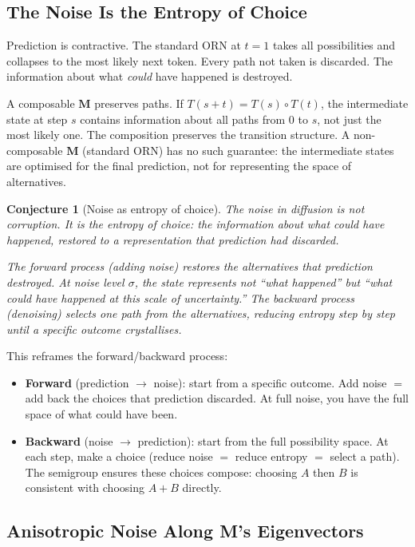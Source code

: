\documentclass[11pt, a4paper]{article}
\newcommand{\M}{\mathbf{M}}
\theoremstyle{plain}
\newtheorem{conjecture}{Conjecture}
\theoremstyle{remark}
\begin{document}
\subsection{The Noise Is the Entropy of Choice}

Prediction is contractive.
The standard ORN at $t{=}1$ takes all possibilities and collapses to the most likely next token.
Every path not taken is discarded.
The information about what \emph{could} have happened is destroyed.

A composable $\M$ preserves paths.
If $T(s{+}t) = T(s) \circ T(t)$, the intermediate state at step $s$ contains information about all paths from 0 to $s$, not just the most likely one.
The composition preserves the transition structure.
A non-composable $\M$ (standard ORN) has no such guarantee: the intermediate states are optimised for the final prediction, not for representing the space of alternatives.

\begin{conjecture}[Noise as entropy of choice]
The noise in diffusion is not corruption.
It is the \emph{entropy of choice}: the information about what could have happened, restored to a representation that prediction had discarded.

The forward process (adding noise) restores the alternatives that prediction destroyed.
At noise level $\sigma$, the state represents not ``what happened'' but ``what could have happened at this scale of uncertainty.''
The backward process (denoising) selects one path from the alternatives, reducing entropy step by step until a specific outcome crystallises.
\end{conjecture}

This reframes the forward/backward process:
\begin{itemize}[nosep]
    \item \textbf{Forward} (prediction $\to$ noise): start from a specific outcome.  Add noise $=$ add back the choices that prediction discarded.  At full noise, you have the full space of what could have been.
    \item \textbf{Backward} (noise $\to$ prediction): start from the full possibility space.  At each step, make a choice (reduce noise $=$ reduce entropy $=$ select a path).  The semigroup ensures these choices compose: choosing $A$ then $B$ is consistent with choosing $A{+}B$ directly.
\end{itemize}

\subsection{Anisotropic Noise Along M's Eigenvectors}
\end{document}
